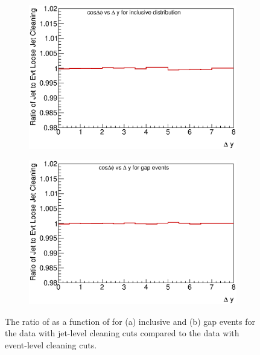 \begin{figure}
\centering
        \begin{subfigure}[b]{0.5\textwidth}
                \centering
                \includegraphics[width=\textwidth]{figures/GBJ2/jetcleaning/Clean___cosdPhi_deltaY_Ratio_Loose_JetEvt_Data.eps}
        \end{subfigure}%
        \begin{subfigure}[b]{0.5\textwidth}
                \centering
                \includegraphics[width=\textwidth]{figures/GBJ2/jetcleaning/Clean___cosdPhi_deltaY_gap_Ratio_Loose_JetEvt_Data.eps}
        \end{subfigure}%
\caption[Comparison between event and jet level cleaning cuts on the \mean{\cosdphi{}}]{
The ratio of \mean{\cosdphi{}} as a function of \dy{} for (a) inclusive and (b) gap events for the data with jet-level cleaning cuts compared to the data with event-level cleaning cuts.
\label{GBJ2:JetCleaning:cos}}
\end{figure}


